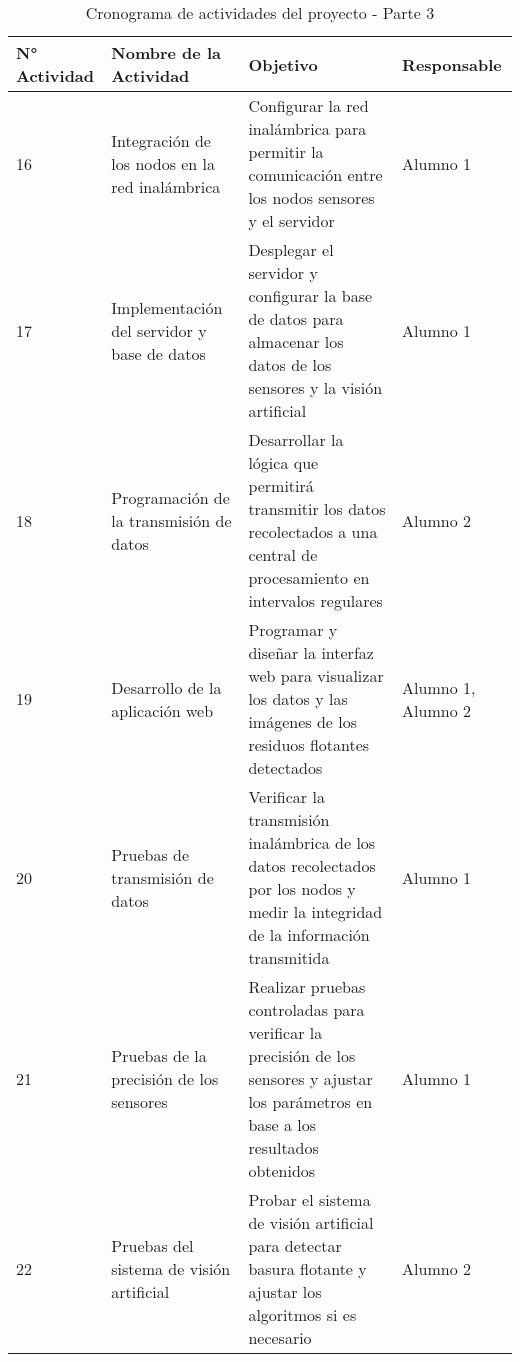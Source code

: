 \begin{table}[H]
    \centering
    \renewcommand{\arraystretch}{1.5}
    \begin{tabular}{ |p{1.5cm}|p{5cm}|p{5.5cm}|p{2.5cm}| }

        \hline
        \textbf{N° Actividad} & \textbf{Nombre de la Actividad} & \textbf{Objetivo} & \textbf{Responsable} \\
        \hline

        16 & Integración de los nodos en la red inalámbrica & Configurar la red inalámbrica para permitir la comunicación entre los nodos sensores y el servidor & Alumno 1 \\\hline
        17 & Implementación del servidor y base de datos & Desplegar el servidor y configurar la base de datos para almacenar los datos de los sensores y la visión artificial & Alumno 1 \\\hline
        18 & Programación de la transmisión de datos & Desarrollar la lógica que permitirá transmitir los datos recolectados a una central de procesamiento en intervalos regulares & Alumno 2 \\\hline
        19 & Desarrollo de la aplicación web & Programar y diseñar la interfaz web para visualizar los datos y las imágenes de los residuos flotantes detectados & Alumno 1, Alumno 2 \\\hline
        20 & Pruebas de transmisión de datos & Verificar la transmisión inalámbrica de los datos recolectados por los nodos y medir la integridad de la información transmitida & Alumno 1 \\\hline
        21 & Pruebas de la precisión de los sensores & Realizar pruebas controladas para verificar la precisión de los sensores y ajustar los parámetros en base a los resultados obtenidos & Alumno 1 \\\hline
        22 & Pruebas del sistema de visión artificial & Probar el sistema de visión artificial para detectar basura flotante y ajustar los algoritmos si es necesario & Alumno 2 \\\hline

    \end{tabular}
    \caption{Cronograma de actividades del proyecto - Parte 3}
    \label{tab:cronograma_proyecto_parte3}
\end{table}
